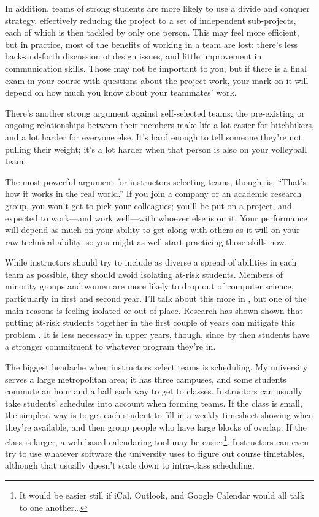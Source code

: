 \documentclass{report}
\begin{document}
In addition, teams of strong students are more likely to use a divide
and conquer strategy, effectively reducing the project to a set of
independent sub-projects, each of which is then tackled by only one
person.  This may feel more efficient, but in practice, most of the
benefits of working in a team are lost: there's less back-and-forth
discussion of design issues, and little improvement in communication
skills.  Those may not be important to you, but if there is a final
exam in your course with questions about the project work, your mark
on it will depend on how much you know about your teammates' work.

There's another strong argument against self-selected teams: the
pre-existing or ongoing relationships between their members make life
a lot easier for hitchhikers, and a lot harder for everyone else.
It's hard enough to tell someone they're not pulling their weight;
it's a lot harder when that person is also on your volleyball team.

The most powerful argument for instructors selecting teams, though,
is, ``That's how it works in the real world.''  If you join a company
or an academic research group, you won't get to pick your colleagues;
you'll be put on a project, and expected to work---and work
well---with whoever else is on it.  Your performance will depend as
much on your ability to get along with others as it will on your raw
technical ability, so you might as well start practicing those skills
now.

While instructors should try to include as diverse a spread of
abilities in each team as possible, they should avoid isolating
at-risk students.  Members of minority groups and women are more
likely to drop out of computer science, particularly in first and
second year.  I'll talk about this more in ,
but one of the main reasons is feeling isolated or out of place.
Research has shown shown that putting at-risk students together in the
first couple of years can mitigate this problem
\cite{b:margolis-fisher-unlocking-clubhouse}.  It is less necessary in
upper years, though, since by then students have a stronger commitment
to whatever program they're in.

The biggest headache when instructors select teams is scheduling.  My
university serves a large metropolitan area; it has three campuses,
and some students commute an hour and a half each way to get to
classes.  Instructors can usually take students' schedules into
account when forming teams.  If the class is small, the simplest way
is to get each student to fill in a weekly timesheet showing when
they're available, and then group people who have large blocks of
overlap.  If the class is larger, a web-based calendaring tool may be
easier\footnote{It would be easier still if iCal, Outlook, and Google
Calendar would all talk to one another{\ldots}}.  Instructors can even
try to use whatever software the university uses to figure out course
timetables, although that usually doesn't scale down to intra-class
scheduling.
\end{document}
